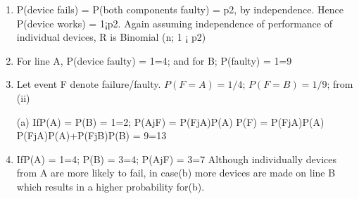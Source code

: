 \documentclass[a4paper,12pt]{article}
\begin{document}
\begin{enumerate}
    \item P(device fails) = P(both components faulty) = p2, by independence. Hence P(device works) =
1¡p2. Again assuming independence of performance of individual devices, R is Binomial
(n; 1 ¡ p2)
\item For line A, P(device faulty) = 1=4; and for B; P(faulty) = 1=9
\item  Let event F denote failure/faulty.
$P(F=A) = 1/4$; $P(F=B) = 1/9$; from (ii)

(a) IfP(A) = P(B) = 1=2; P(AjF) = P(FjA)P(A)
P(F) = P(FjA)P(A)
P(FjA)P(A)+P(FjB)P(B) = 9=13
\item  IfP(A) = 1=4; P(B) = 3=4; P(AjF) = 3=7
Although individually devices from A are more likely to fail, in case(b) more devices
are made on line B which results in a higher probability for(b).
\end{enumerate}
\end{document}
